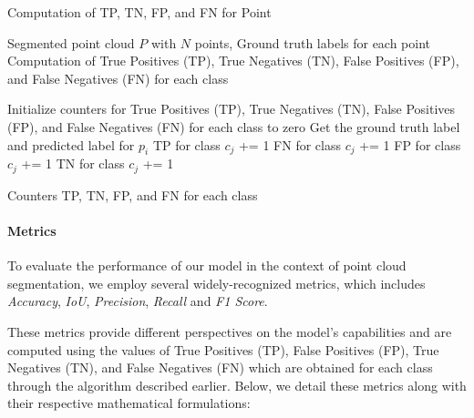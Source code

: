 \documentclass[11pt, a4paper,oneside,chapterprefix=false]{scrbook}
\begin{document}
\begin{algorithm}[H]
\caption{Computation of TP, TN, FP, and FN for Point} \label{alg:computation of tp, tn, fp, fn}
\begin{algorithmic}[1]
\Require Segmented point cloud \(P\) with \(N\) points, Ground truth labels for each point
\Ensure Computation of True Positives (TP), True Negatives (TN), False Positives (FP), and False Negatives (FN) for each class

\State Initialize counters for True Positives (TP), True Negatives (TN), False Positives (FP), and False Negatives (FN) for each class to zero
    \State Get the ground truth label and predicted label for \(p_i\)
                \State TP for class \(c_j\) += 1
            \Else
                \State FN for class \(c_j\) += 1
            \EndIf
        \Else
                \State FP for class \(c_j\) += 1
            \Else
                \State TN for class \(c_j\) += 1
            \EndIf
        \EndIf
    \EndFor
\EndFor

\State \Return Counters TP, TN, FP, and FN for each class
\end{algorithmic}
\end{algorithm}

\paragraph{Metrics} \label{par:metrics}

To evaluate the performance of our model in the context of point cloud segmentation, we employ several widely-recognized metrics, which includes \emph{Accuracy}, \emph{IoU}, \emph{Precision}, \emph{Recall} and \emph{F1 Score}. 

\vspace{10pt}

These metrics provide different perspectives on the model's capabilities and are computed using the values of True Positives (TP), False Positives (FP), True Negatives (TN), and False Negatives (FN) which are obtained for each class through the algorithm described earlier. Below, we detail these metrics along with their respective mathematical formulations:

\vspace{10pt}
\end{document}
